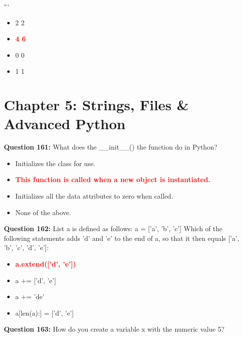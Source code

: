 \documentclass[12pt,a4paper]{article}
\begin{document}
\newline
```

\begin{itemize}
    \item[\textbf{A.}] 2 2
    \item[\textbf{B.}] \textcolor{red}{\textbf{4 6}}
    \item[\textbf{C.}] 0 0
    \item[\textbf{D.}] 1 1
\end{itemize}

\vspace{0.5cm}

\section{Chapter 5: Strings, Files & Advanced Python}

\textbf{Question 161:} What does the __init__() the function do in Python?

\begin{itemize}
    \item[\textbf{A.}] Initializes the class for use.
    \item[\textbf{B.}] \textcolor{red}{\textbf{This function is called when a new object is instantiated.}}
    \item[\textbf{C.}] Initializes all the data attributes to zero when called.
    \item[\textbf{D.}] None of the above.
\end{itemize}

\vspace{0.5cm}

\textbf{Question 162:} List a is defined as follows: a = ['a', 'b', 'c'] Which of the following statements adds 'd' and 'e' to the end of a, so that it then equals ['a', 'b', 'c', 'd', 'e']:

\begin{itemize}
    \item[\textbf{A.}] \textcolor{red}{\textbf{a.extend(['d', 'e'])}}
    \item[\textbf{B.}] a += ['d', 'e']
    \item[\textbf{C.}] a += 'de'
    \item[\textbf{D.}] a[len(a):] = ['d', 'e']
\end{itemize}

\vspace{0.5cm}

\textbf{Question 163:} How do you create a variable x with the numeric value 5?
\end{document}
